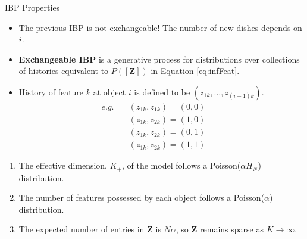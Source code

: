 \documentclass[aspectratio=169,xcolor=dvipsnames]{beamer}
\newcommand{\matz}{\textbf{Z}}
\begin{document}
\begin{frame}{IBP Properties}
\setlength{\leftmargini}{0.2cm}
\begin{itemize}[<+->]
\item The previous IBP is not exchangeable! The number of new dishes depends on $i$. 
\item \textbf{Exchangeable IBP} is a generative process for distributions over collections of histories equivalent to $P([\matz])$ in Equation \ref{eq:infFeat}.
\item History of feature $k$ at object $i$ is defined to be $(z_{1k},\dots,z_{(i-1)k})$.
\begin{align*}
    e.g. \quad &(z_{1k}, z_{1k}) = (0, 0) \quad \quad\\
    &(z_{1k}, z_{2k}) = (1, 0)\\
    &(z_{1k}, z_{2k}) = (0, 1)\\
    &(z_{1k}, z_{2k}) = (1, 1)
\end{align*}
\end{itemize}
\setlength{\leftmargini}{0.4cm}
\begin{enumerate}[<+->]
\item The effective dimension, $K_+$, of the model follows a Poisson($\alpha H_N$) distribution.
\item The number of features possessed by each object follows a Poisson($\alpha$)  distribution.
\item The expected number of entries in $\matz$ is $N\alpha$, so $\matz$ remains sparse as $K \rightarrow \infty$.
\end{enumerate}
\end{frame}
\end{document}
